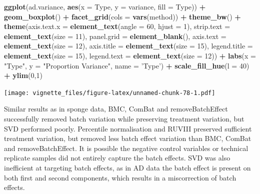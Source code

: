 \documentclass[]{book}
\newenvironment{Shaded}{\begin{snugshade}}{\end{snugshade}}
\newcommand{\KeywordTok}[1]{\textcolor[rgb]{0.13,0.29,0.53}{\textbf{#1}}}
\newcommand{\DataTypeTok}[1]{\textcolor[rgb]{0.13,0.29,0.53}{#1}}
\newcommand{\DecValTok}[1]{\textcolor[rgb]{0.00,0.00,0.81}{#1}}
\newcommand{\StringTok}[1]{\textcolor[rgb]{0.31,0.60,0.02}{#1}}
\newcommand{\OperatorTok}[1]{\textcolor[rgb]{0.81,0.36,0.00}{\textbf{#1}}}
\newcommand{\NormalTok}[1]{#1}
\begin{document}
\begin{Shaded}
\begin{Highlighting}[]
\KeywordTok{ggplot}\NormalTok{(ad.variance, }\KeywordTok{aes}\NormalTok{(}\DataTypeTok{x =}\NormalTok{ Type, }\DataTypeTok{y =}\NormalTok{ variance, }\DataTypeTok{fill =}\NormalTok{ Type)) }\OperatorTok{+}\StringTok{ }
\StringTok{  }\KeywordTok{geom_boxplot}\NormalTok{() }\OperatorTok{+}\StringTok{ }\KeywordTok{facet_grid}\NormalTok{(}\DataTypeTok{cols =} \KeywordTok{vars}\NormalTok{(method)) }\OperatorTok{+}\StringTok{ }\KeywordTok{theme_bw}\NormalTok{() }\OperatorTok{+}\StringTok{ }
\StringTok{  }\KeywordTok{theme}\NormalTok{(}\DataTypeTok{axis.text.x =} \KeywordTok{element_text}\NormalTok{(}\DataTypeTok{angle =} \DecValTok{60}\NormalTok{, }\DataTypeTok{hjust =} \DecValTok{1}\NormalTok{), }
        \DataTypeTok{strip.text =} \KeywordTok{element_text}\NormalTok{(}\DataTypeTok{size =} \DecValTok{11}\NormalTok{), }\DataTypeTok{panel.grid =} \KeywordTok{element_blank}\NormalTok{(), }
        \DataTypeTok{axis.text =} \KeywordTok{element_text}\NormalTok{(}\DataTypeTok{size =} \DecValTok{12}\NormalTok{), }\DataTypeTok{axis.title =} \KeywordTok{element_text}\NormalTok{(}\DataTypeTok{size =} \DecValTok{15}\NormalTok{),}
        \DataTypeTok{legend.title =} \KeywordTok{element_text}\NormalTok{(}\DataTypeTok{size =} \DecValTok{15}\NormalTok{), }\DataTypeTok{legend.text =} \KeywordTok{element_text}\NormalTok{(}\DataTypeTok{size =} \DecValTok{12}\NormalTok{)) }\OperatorTok{+}\StringTok{ }
\StringTok{  }\KeywordTok{labs}\NormalTok{(}\DataTypeTok{x =} \StringTok{"Type"}\NormalTok{, }\DataTypeTok{y =} \StringTok{"Proportion Variance"}\NormalTok{, }\DataTypeTok{name =} \StringTok{'Type'}\NormalTok{) }\OperatorTok{+}\StringTok{ }
\StringTok{  }\KeywordTok{scale_fill_hue}\NormalTok{(}\DataTypeTok{l =} \DecValTok{40}\NormalTok{) }\OperatorTok{+}\StringTok{ }\KeywordTok{ylim}\NormalTok{(}\DecValTok{0}\NormalTok{,}\DecValTok{1}\NormalTok{)}
\end{Highlighting}
\end{Shaded}

\texttt{[image: vignette\_files/figure-latex/unnamed-chunk-78-1.pdf]}

Similar results as in sponge data, BMC, ComBat and removeBatchEffect
successfully removed batch variation while preserving treatment
variation, but SVD performed poorly. Percentile normalisation and RUVIII
preserved sufficient treatment variation, but removed less batch effect
variation than BMC, ComBat and removeBatchEffect. It is possible the
negative control variables or technical replicate samples did not
entirely capture the batch effects. SVD was also inefficient at
targeting batch effects, as in AD data the batch effect is present on
both first and second components, which results in a miscorrection of
batch effects.
\end{document}
